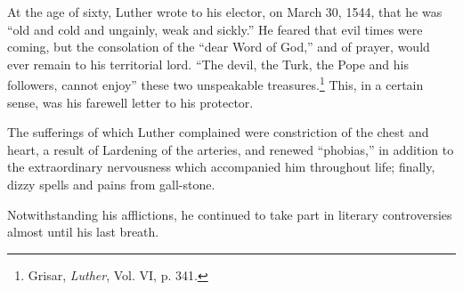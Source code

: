 At the age of sixty, Luther wrote to his elector, on March 30, 1544,
that he was “old and cold and ungainly, weak and sickly.” He feared
that evil times were coming, but the consolation of the “dear Word of
God,” and of prayer, would ever remain to his territorial lord. “The
devil, the Turk, the Pope and his followers, cannot enjoy” these
two unspeakable treasures.\footnote{Grisar, \textit{Luther}, Vol. VI, p. 341.}
This, in a certain sense, was his farewell
letter to his protector.

The sufferings of which Luther complained were constriction of
the chest and heart, a result of Lardening of the arteries, and renewed
“phobias,” in addition to the extraordinary nervousness which
accompanied him throughout life; finally, dizzy spells and pains from
gall-stone.

Notwithstanding his afflictions, he continued to take part in literary
controversies almost until his last breath.

